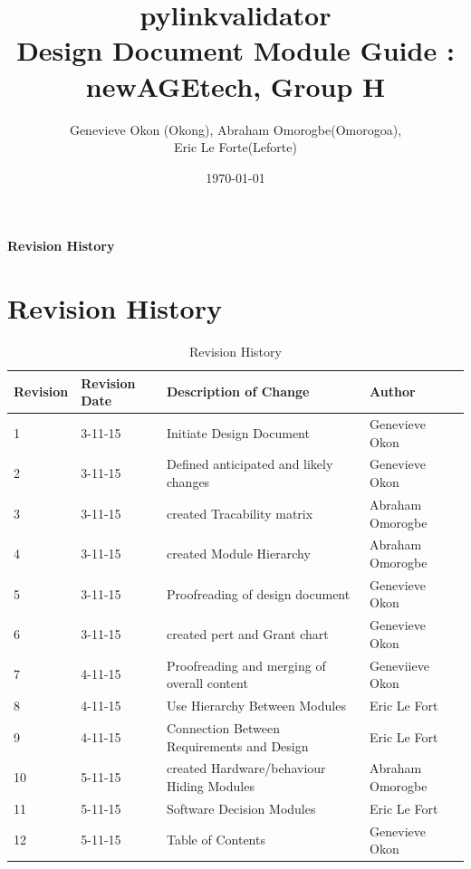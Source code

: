 \documentclass[titlepage]{article}
\begin{document}
\title{pylinkvalidator \\
 Design Document Module Guide : newAGEtech, Group H }
\author{Genevieve Okon (Okong), Abraham Omorogbe(Omorogoa),\\
 Eric Le Forte(Leforte)}
\date{\today}
\maketitle


\tableofcontents
\listoffigures
\listoftables

\textbf{Revision History} \\ \normalsize
\pagebreak

\section{Revision History}
\begin{table}[h!]
	\begin{tabular}{| p{5cm} | p{5cm} | p{5cm} |p{5cm} |}    \hline
Revision  &Revision Date &Description of Change &Author\\ \hline
1& 3-11-15& Initiate Design Document&Genevieve Okon\\ \hline
2& 3-11-15& Defined anticipated and likely changes&Genevieve Okon\\ \hline
3& 3-11-15& created Tracability matrix &Abraham Omorogbe\\ \hline
4& 3-11-15& created  Module Hierarchy&Abraham Omorogbe\\ \hline
5& 3-11-15&Proofreading of design document&Genevieve Okon\\ \hline
6& 3-11-15&created pert and Grant chart&Genevieve Okon\\ \hline
7& 4-11-15& Proofreading and merging of overall content&Geneviieve Okon\\ \hline
8& 4-11-15& Use Hierarchy Between Modules&Eric Le Fort\\ \hline
9& 4-11-15&Connection Between Requirements and Design&Eric Le Fort\\ \hline
10& 5-11-15& created Hardware/behaviour Hiding Modules&Abraham Omorogbe\\ \hline
11& 5-11-15& Software Decision Modules&Eric Le Fort\\ \hline
12& 5-11-15& Table of Contents&Genevieve Okon\\ \hline
       \end{tabular}
       
       \caption{Revision History}
       \label{table:Revision History}
\end{table}
\end{document}
